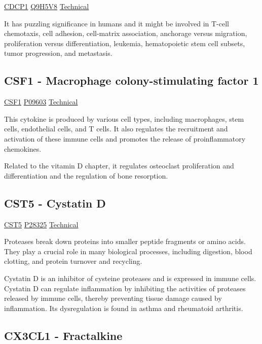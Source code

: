 \href{https://en.wikipedia.org/wiki/CDCP1}{CDCP1}
\href{http://www.uniprot.org/uniprot/Q9H5V8}{Q9H5V8}
\href{https://olink.com/products-services/target/protein/?assayID=5067}{Technical}

It has puzzling significance in humans and it might be involved in T-cell chemotaxis, cell adhesion, cell-matrix association, anchorage versus migration, proliferation versus differentiation, leukemia, hematopoietic stem cell subsets, tumor progression, and metastasis.


\subsection{CSF1 - Macrophage colony-stimulating factor 1}

\href{https://en.wikipedia.org/wiki/Macrophage\_colony-stimulating\_factor}{CSF1}
\href{http://www.uniprot.org/uniprot/P09603}{P09603}
\href{https://olink.com/products-services/target/protein/?assayID=5110}{Technical}

This cytokine is produced by various cell types, including macrophages, stem cells, endothelial cells, and T cells. It also regulates the recruitment and activation of these immune cells and promotes the release of proinflammatory chemokines.

Related to the vitamin D chapter, it regulates osteoclast proliferation and differentiation and the regulation of bone resorption.

\subsection{CST5 - Cystatin D}

\href{https://en.wikipedia.org/wiki/CST5}{CST5}
\href{http://www.uniprot.org/uniprot/P28325}{P28325}
\href{https://olink.com/products-services/target/protein/?assayID=5082}{Technical}

Proteases break down proteins into smaller peptide fragments or amino acids. They play a crucial role in many biological processes, including digestion, blood clotting, and protein turnover and recycling.

Cystatin D is an inhibitor of cysteine proteases and is expressed in immune cells. Cystatin D can regulate inflammation by inhibiting the activities of proteases released by immune cells, thereby preventing tissue damage caused by inflammation. Its dysregulation is found in asthma and rheumatoid arthritis.

\subsection{CX3CL1 - Fractalkine}

